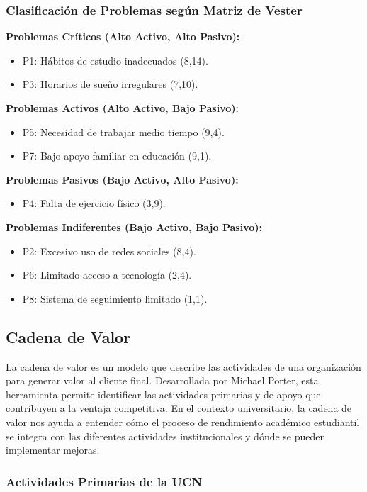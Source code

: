 \documentclass[12pt,letterpaper]{report}
\begin{document}
\subsubsection{Clasificación de Problemas según Matriz de Vester}

\textbf{Problemas Críticos (Alto Activo, Alto Pasivo):}
\begin{itemize}
    \item P1: Hábitos de estudio inadecuados (8,14).
    \item P3: Horarios de sueño irregulares (7,10).
\end{itemize}

\textbf{Problemas Activos (Alto Activo, Bajo Pasivo):}
\begin{itemize}
    \item P5: Necesidad de trabajar medio tiempo (9,4).
    \item P7: Bajo apoyo familiar en educación (9,1).
\end{itemize}

\textbf{Problemas Pasivos (Bajo Activo, Alto Pasivo):}
\begin{itemize}
    \item P4: Falta de ejercicio físico (3,9).
\end{itemize}

\textbf{Problemas Indiferentes (Bajo Activo, Bajo Pasivo):}
\begin{itemize}
    \item P2: Excesivo uso de redes sociales (8,4).
    \item P6: Limitado acceso a tecnología (2,4).
    \item P8: Sistema de seguimiento limitado (1,1).
\end{itemize}

\subsection{Cadena de Valor}

La cadena de valor es un modelo que describe las actividades de una organización para generar valor al cliente final. Desarrollada por Michael Porter, esta herramienta permite identificar las actividades primarias y de apoyo que contribuyen a la ventaja competitiva. En el contexto universitario, la cadena de valor nos ayuda a entender cómo el proceso de rendimiento académico estudiantil se integra con las diferentes actividades institucionales y dónde se pueden implementar mejoras.

\subsubsection{Actividades Primarias de la UCN}
\end{document}
